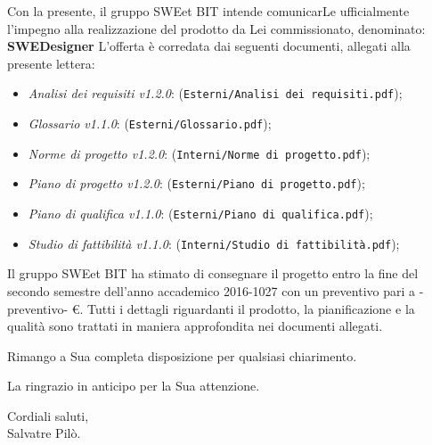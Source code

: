 \vspace{5mm}Con la presente, il gruppo SWEet BIT intende comunicarLe ufficialmente l'impegno
	alla realizzazione del prodotto da Lei commissionato, denominato: {\textbf{SWEDesigner}} \newline
	L'offerta è corredata dai seguenti documenti, allegati alla presente lettera:
	\begin{itemize}
		\item \emph{Analisi dei requisiti v1.2.0}: (\verb|Esterni/Analisi dei requisiti.pdf|);
		\item \emph{Glossario v1.1.0}: (\verb|Esterni/Glossario.pdf|);
		\item \emph{Norme di progetto v1.2.0}: (\verb|Interni/Norme di progetto.pdf|);
		\item \emph{Piano di progetto v1.2.0}: (\verb|Esterni/Piano di progetto.pdf|);
		\item \emph{Piano di qualifica v1.1.0}: (\verb|Esterni/Piano di qualifica.pdf|);
		\item \emph{Studio di fattibilità v1.1.0}: (\verb|Interni/Studio di fattibilità.pdf|);
	\end{itemize}
	Il gruppo SWEet BIT ha stimato di consegnare il progetto entro la fine del secondo semestre dell'anno accademico 2016-1027
	con un preventivo pari a -preventivo- \euro .
	Tutti i dettagli riguardanti il prodotto, la pianificazione e la qualità sono trattati in maniera approfondita
	nei documenti allegati.
	\begin{flushleft}
	\vspace{2cm}
		Rimango a Sua completa disposizione per qualsiasi chiarimento.
	\end{flushleft}
	\begin{flushleft}
		La ringrazio in anticipo per la Sua attenzione.
	\end{flushleft}
	\vspace{5mm}
	\begin{center}
		Cordiali saluti,\\
		\vspace{1cm}Salvatre Pilò.
	\end{center}
